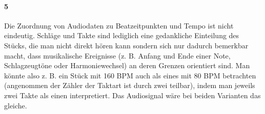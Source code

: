 {	\paragraph{5}  %
	{
		Die Zuordnung von Audiodaten zu Beatzeitpunkten und Tempo ist nicht eindeutig.
		Schläge und Takte sind lediglich eine gedankliche Einteilung des Stücks,
			die man nicht direkt hören kann
			sondern sich nur dadurch bemerkbar macht,
			dass musikalische Ereignisse
			(z. B. Anfang und Ende einer Note, Schlagzeugtöne oder Harmoniewechsel)
			an deren Grenzen orientiert sind.
		Man könnte also z. B. ein Stück mit 160 BPM auch als eines mit 80 BPM betrachten
			(angenommen der Zähler der Taktart ist durch zwei teilbar),
			indem man jeweils zwei Takte als einen interpretiert.
		Das Audiosignal wäre bei beiden Varianten das gleiche.
	}


}
